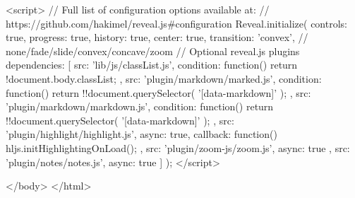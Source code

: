 		<script>
			// Full list of configuration options available at:
			// https://github.com/hakimel/reveal.js#configuration
			Reveal.initialize({
				controls: true,
				progress: true,
				history: true,
				center: true,
				transition: 'convex', // none/fade/slide/convex/concave/zoom
				// Optional reveal.js plugins
				dependencies: [
					{ src: 'lib/js/classList.js', condition: function() { return !document.body.classList; } },
					{ src: 'plugin/markdown/marked.js', condition: function() { return !!document.querySelector( '[data-markdown]' ); } },
					{ src: 'plugin/markdown/markdown.js', condition: function() { return !!document.querySelector( '[data-markdown]' ); } },
					{ src: 'plugin/highlight/highlight.js', async: true, callback: function() { hljs.initHighlightingOnLoad(); } },
					{ src: 'plugin/zoom-js/zoom.js', async: true },
					{ src: 'plugin/notes/notes.js', async: true }
				]
			});
		</script>

	</body>
</html>